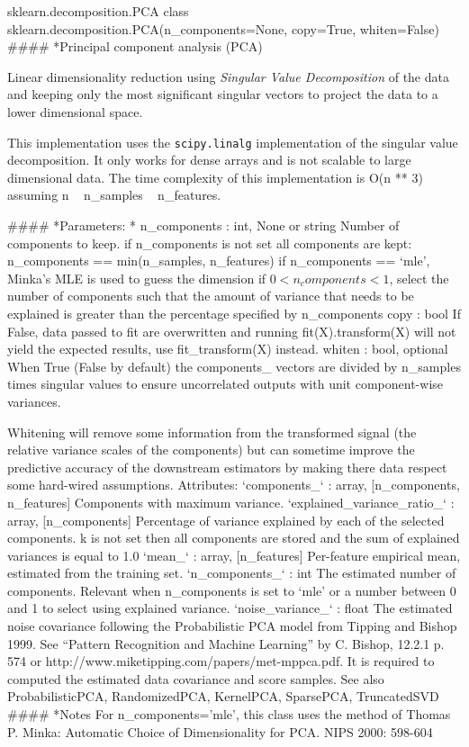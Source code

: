sklearn.decomposition.PCA
class sklearn.decomposition.PCA(n_components=None, copy=True, whiten=False)
#### *{Principal component analysis (PCA)}

Linear dimensionality reduction using \textit{Singular Value Decomposition} of the data and keeping only the most significant singular vectors to project the data to a lower dimensional space.

This implementation uses the \texttt{scipy.linalg} implementation of the singular value decomposition. It only works for dense arrays and is not scalable to large dimensional data.
The time complexity of this implementation is O(n ** 3) assuming n ~ n_samples ~ n_features.

#### *{Parameters:} 
* n\_components : int, None or string
Number of components to keep. if n_components is not set all components are kept:
n_components == min(n_samples, n_features)
if n_components == ‘mle’, Minka’s MLE is used to guess the dimension if $0 < n_components < 1$, select the number of components such that the amount of variance that needs to be explained is greater than the percentage specified by n_components
 copy : bool
If False, data passed to fit are overwritten and running fit(X).transform(X) will not yield the expected results, use fit_transform(X) instead.
 whiten : bool, optional
When True (False by default) the components_ vectors are divided by n_samples times singular values to ensure uncorrelated outputs with unit component-wise variances.
 

Whitening will remove some information from the transformed signal (the relative variance scales of the components) but can sometime improve the predictive accuracy of the downstream estimators by making there data respect some hard-wired assumptions.
Attributes: 
`components_` : array, [n_components, n_features]
Components with maximum variance.
`explained_variance_ratio_` : array, [n_components]
Percentage of variance explained by each of the selected components. k is not set then all components are stored and the sum of explained variances is equal to 1.0
`mean_` : array, [n_features]
Per-feature empirical mean, estimated from the training set.
`n_components_` : int
The estimated number of components. Relevant when n_components is set to ‘mle’ or a number between 0 and 1 to select using explained variance.
`noise_variance_` : float
The estimated noise covariance following the Probabilistic PCA model from Tipping and Bishop 1999. See “Pattern Recognition and Machine Learning” by C. Bishop, 12.2.1 p. 574 or http://www.miketipping.com/papers/met-mppca.pdf. It is required to computed the estimated data covariance and score samples.
See also ProbabilisticPCA, RandomizedPCA, KernelPCA, SparsePCA, TruncatedSVD
#### *{Notes}
For n_components=’mle’, this class uses the method of Thomas P. Minka: Automatic Choice of Dimensionality for PCA. NIPS 2000: 598-604

